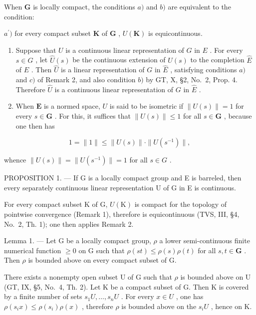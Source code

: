 When \(\mathbf{G}\) is locally compact, the conditions \(a)\) and \(b)\) are equivalent to the condition:

\(a^{\prime})\) for every compact subset \(\mathbf{K}\) of \(\mathbf{G}\) , \(U(\mathbf{K})\) is equicontinuous.

\begin{enumerate}
\def\labelenumi{\arabic{enumi})}
\setcounter{enumi}{2}
\item
  Suppose that \(U\) is a continuous linear representation of \(G\) in \(E\) . For every \(s \in G\) , let \(\widehat{U}(s)\) be the continuous extension of \(U(s)\) to the completion \(\widehat{E}\) of \(E\) . Then \(\widehat{U}\) is a linear representation of \(G\) in \(\widehat{E}\) , satisfying conditions \(a)\) and \(c)\) of Remark 2, and also condition \(b)\) by GT, X, §2, No.~2, Prop. 4. Therefore \(\widehat{U}\) is a continuous linear representation of \(G\) in \(\widehat{E}\) .
\item
  When \(\mathbf{E}\) is a normed space, \(U\) is said to be isometric if \(\| U(s)\| = 1\) for every \(s\in \mathbf{G}\) . For this, it suffices that \(\| U(s)\| \leqslant 1\) for all \(s\in \mathbf{G}\) , because one then has
\end{enumerate}

\[
1 = \| 1 \| \leqslant \| U (s) \| \cdot \| U (s ^ {- 1}) \|,
\]

whence \(\| U(s)\| = \| U(s^{-1})\| = 1\) for all \(s\in G\) .

PROPOSITION 1. --- If G is a locally compact group and E is barreled, then every separately continuous linear representation U of G in E is continuous.

For every compact subset K of G, \(U(\mathrm{K})\) is compact for the topology of pointwise convergence (Remark 1), therefore is equicontinuous (TVS, III, §4, No.~2, Th. 1); one then applies Remark 2.

Lemma 1. --- Let G be a locally compact group, \(\rho\) a lower semi-continuous finite numerical function \(\geqslant 0\) on G such that \(\rho(st) \leqslant \rho(s)\rho(t)\) for all \(s, t \in \mathbf{G}\) . Then \(\rho\) is bounded above on every compact subset of G.

There exists a nonempty open subset U of G such that \(\rho\) is bounded above on U (GT, IX, §5, No.~4, Th. 2). Let K be a compact subset of G. Then K is covered by a finite number of sets \(s_{1}U,\ldots,s_{n}U\) . For every \(x\in U\) , one has \(\rho(s_{i}x)\leqslant\rho(s_{i})\rho(x)\) , therefore \(\rho\) is bounded above on the \(s_{i}U\) , hence on K.

